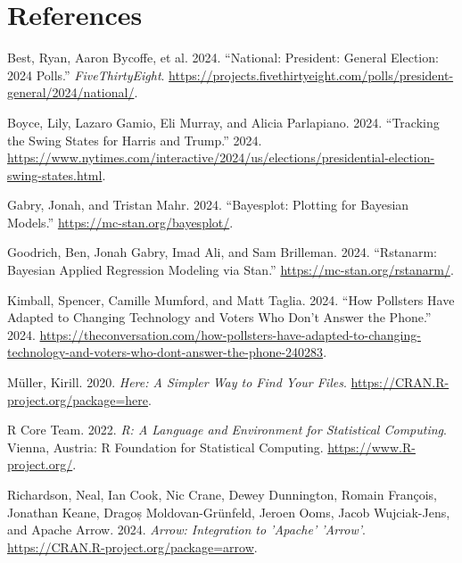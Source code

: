 \documentclass[
  letterpaper,
  DIV=11,
  numbers=noendperiod]{scrartcl}
\newlength{\cslhangindent}
\newlength{\cslentryspacingunit} %
\newenvironment{CSLReferences}[2] %
 {%
  \setlength{\parindent}{0pt}
  \ifodd #1
  \let\oldpar\par
  \def\par{\hangindent=\cslhangindent\oldpar}
  \fi
  \setlength{\parskip}{#2\cslentryspacingunit}
 }%
 {}
\begin{document}
\newpage

\hypertarget{references}{%
\section*{References}\label{references}}

\hypertarget{refs}{}
\begin{CSLReferences}{1}{0}
\leavevmode{}%
Best, Ryan, Aaron Bycoffe, et al. 2024. {``National: President: General
Election: 2024 Polls.''} \emph{FiveThirtyEight}.
\url{https://projects.fivethirtyeight.com/polls/president-general/2024/national/}.

\leavevmode{}%
Boyce, Lily, Lazaro Gamio, Eli Murray, and Alicia Parlapiano. 2024.
{``Tracking the Swing States for Harris and Trump.''} 2024.
\url{https://www.nytimes.com/interactive/2024/us/elections/presidential-election-swing-states.html}.

\leavevmode{}%
Gabry, Jonah, and Tristan Mahr. 2024. {``Bayesplot: Plotting for
Bayesian Models.''} \url{https://mc-stan.org/bayesplot/}.

\leavevmode{}%
Goodrich, Ben, Jonah Gabry, Imad Ali, and Sam Brilleman. 2024.
{``Rstanarm: {Bayesian} Applied Regression Modeling via {Stan}.''}
\url{https://mc-stan.org/rstanarm/}.

\leavevmode{}%
Kimball, Spencer, Camille Mumford, and Matt Taglia. 2024. {``How
Pollsters Have Adapted to Changing Technology and Voters Who Don't
Answer the Phone.''} 2024.
\url{https://theconversation.com/how-pollsters-have-adapted-to-changing-technology-and-voters-who-dont-answer-the-phone-240283}.

\leavevmode{}%
Müller, Kirill. 2020. \emph{Here: A Simpler Way to Find Your Files}.
\url{https://CRAN.R-project.org/package=here}.

\leavevmode{}%
R Core Team. 2022. \emph{R: A Language and Environment for Statistical
Computing}. Vienna, Austria: R Foundation for Statistical Computing.
\url{https://www.R-project.org/}.

\leavevmode{}%
Richardson, Neal, Ian Cook, Nic Crane, Dewey Dunnington, Romain
François, Jonathan Keane, Dragoș Moldovan-Grünfeld, Jeroen Ooms, Jacob
Wujciak-Jens, and Apache Arrow. 2024. \emph{Arrow: Integration to
'Apache' 'Arrow'}. \url{https://CRAN.R-project.org/package=arrow}.


\end{CSLReferences}
\end{document}
